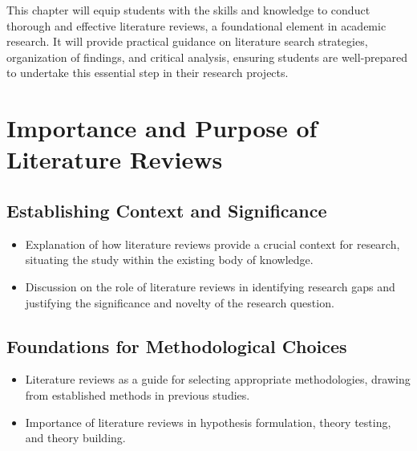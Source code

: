 \documentclass[
]{book}
\begin{document}
This chapter will equip students with the skills and knowledge to conduct thorough and effective literature reviews, a foundational element in academic research. It will provide practical guidance on literature search strategies, organization of findings, and critical analysis, ensuring students are well-prepared to undertake this essential step in their research projects.

\hypertarget{importance-and-purpose-of-literature-reviews}{%
\section*{Importance and Purpose of Literature Reviews}\label{importance-and-purpose-of-literature-reviews}}

\hypertarget{establishing-context-and-significance}{%
\subsection*{Establishing Context and Significance}\label{establishing-context-and-significance}}

\begin{itemize}
\item
  Explanation of how literature reviews provide a crucial context for research, situating the study within the existing body of knowledge.
\item
  Discussion on the role of literature reviews in identifying research gaps and justifying the significance and novelty of the research question.
\end{itemize}

\hypertarget{foundations-for-methodological-choices}{%
\subsection*{Foundations for Methodological Choices}\label{foundations-for-methodological-choices}}

\begin{itemize}
\item
  Literature reviews as a guide for selecting appropriate methodologies, drawing from established methods in previous studies.
\item
  Importance of literature reviews in hypothesis formulation, theory testing, and theory building.
\end{itemize}
\end{document}
